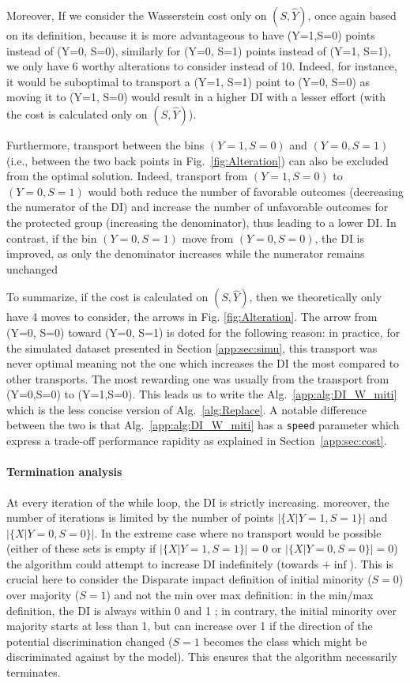 \documentclass[runningheads, orivec]{llncs}
\begin{document}
Moreover, If we consider the Wasserstein cost only on $(S,\widehat{Y})$, once again based on its definition, because it is more advantageous to have (Y=1,S=0) points instead of (Y=0, S=0), similarly for (Y=0, S=1) points instead of (Y=1, S=1), we only have 6 worthy alterations to consider instead of 10. Indeed, for instance, it would be suboptimal to transport a (Y=1, S=1) point to (Y=0, S=0) as moving it to (Y=1, S=0) would result in a higher DI with a lesser effort (with the cost is calculated only on $(S,\widehat{Y})$). 

Furthermore, transport between the bins $(Y=1,S=0)$ and $(Y=0,S=1)$ (i.e., between the two back points in Fig.~\ref{fig:Alteration}) can also be excluded from the optimal solution. Indeed, transport from $(Y=1,S=0)$ to $(Y=0,S=1)$ would both reduce the number of favorable outcomes (decreasing the numerator of the DI) and increase the number of unfavorable outcomes for the protected group (increasing the denominator), thus leading to a lower DI. In contrast, if the bin $(Y=0,S=1)$ move from $(Y=0,S=0)$, the DI is improved, as only the denominator increases while the numerator remains unchanged

To summarize, if the cost is calculated on $(S,\widehat{Y})$, then we theoretically only have 4 moves to consider, the arrows in Fig. \ref{fig:Alteration}. The arrow from (Y=0, S=0) toward (Y=0, S=1) is doted for the following reason: in practice, for the simulated dataset presented in Section \ref{app:sec:simu}, this transport was never optimal meaning not the one which increases the DI the most compared to other transports. The most rewarding one was usually from the transport from (Y=0,S=0) to (Y=1,S=0). This leads us to write the Alg.~\ref{app:alg:DI_W_miti} which is the less concise version of Alg.~\ref{alg:Replace}. A notable difference between the two is that Alg.~\ref{app:alg:DI_W_miti} has a \texttt{speed} parameter which express a trade-off performance rapidity as explained in Section~\ref{app:sec:cost}.

\paragraph{Termination analysis}
At every iteration of the while loop, the DI is strictly increasing. moreover, the number of iterations is limited by the number of points $|\{X|Y=1, S=1\}|$ and $|\{X|Y=0, S=0\}|$. 
In the extreme case where no transport would be possible (either of these sets is empty if $|\{X|Y=1, S=1\}|=0$ or $|\{X|Y=0, S=0\}|=0$) the algorithm could attempt to increase DI indefinitely (towards $+\inf$). This is crucial here to consider the Disparate impact definition of initial minority ($S=0$) over majority ($S=1$) and not the min over max definition: in the min/max definition, the DI is always within 0 and 1 ; in contrary, the initial minority over majority starts at less than 1, but can increase over 1 if the direction of the potential discrimination changed ($S=1$ becomes the class which might be discriminated against by the model). This ensures that the algorithm necessarily terminates.
\end{document}
